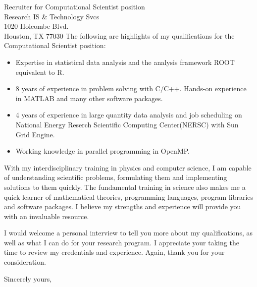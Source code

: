 \documentclass{letter} %
\begin{document}
\begin{letter}{Recruiter for Computational Scientist position \\
Research IS \& Technology Svcs \\
1020 Holcombe Blvd. \\
Houston, TX 77030}
\noindent %
The following are highlights of my qualifications for the Computational Scientist position:
\begin{itemize}
  \item Expertise in statistical data analysis and the analysis framework ROOT equivalent to R.
  \item 8 years of experience in problem solving with C/C++. Hands-on experience in MATLAB and many other software packages.
  \item 4 years of experience in large quantity data analysis and job scheduling on National Energy Reserch Scientific Computing Center(NERSC) with Sun Grid Engine.
  \item Working knowledge in parallel programming in OpenMP.
\end{itemize}

With my interdisciplinary training in physics and computer science, I am capable of understanding scientific problems, formulating them and implementing solutions to them quickly. The fundamental training in science also makes me a quick learner of mathematical theories, programming languages, program libraries and software packages. I believe my strengths and experience will provide you with an invaluable resource.

\noindent %
I would welcome a personal interview to tell you more about my qualifications, as well as what I can do for your research program. I appreciate your taking the time to review my credentials and experience. Again, thank you for your consideration. 
 
\closing{Sincerely yours,} 
 

 

\end{letter}
 
\end{document}
